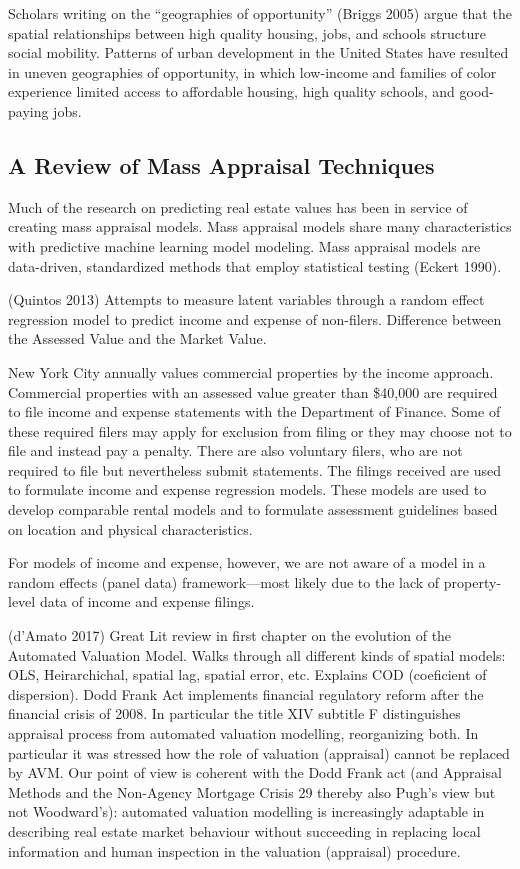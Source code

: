 \documentclass[]{article}
\begin{document}
Scholars writing on the ``geographies of opportunity'' (Briggs 2005)
argue that the spatial relationships between high quality housing, jobs,
and schools structure social mobility. Patterns of urban development in
the United States have resulted in uneven geographies of opportunity, in
which low-income and families of color experience limited access to
affordable housing, high quality schools, and good-paying jobs.

\subsection{A Review of Mass Appraisal
Techniques}\label{a-review-of-mass-appraisal-techniques}

Much of the research on predicting real estate values has been in
service of creating mass appraisal models. Mass appraisal models share
many characteristics with predictive machine learning model modeling.
Mass appraisal models are data-driven, standardized methods that employ
statistical testing (Eckert 1990).

(Quintos 2013) Attempts to measure latent variables through a random
effect regression model to predict income and expense of non-filers.
Difference between the Assessed Value and the Market Value.

New York City annually values commercial properties by the income
approach. Commercial properties with an assessed value greater than
\$40,000 are required to file income and expense statements with the
Department of Finance. Some of these required filers may apply for
exclusion from filing or they may choose not to file and instead pay a
penalty. There are also voluntary filers, who are not required to file
but nevertheless submit statements. The filings received are used to
formulate income and expense regression models. These models are used to
develop comparable rental models and to formulate assessment guidelines
based on location and physical characteristics.

For models of income and expense, however, we are not aware of a model
in a random effects (panel data) framework---most likely due to the lack
of property-level data of income and expense filings.

(d'Amato 2017) Great Lit review in first chapter on the evolution of the
Automated Valuation Model. Walks through all different kinds of spatial
models: OLS, Heirarchichal, spatial lag, spatial error, etc. Explains
COD (coeficient of dispersion). Dodd Frank Act implements financial
regulatory reform after the financial crisis of 2008. In particular the
title XIV subtitle F distinguishes appraisal process from automated
valuation modelling, reorganizing both. In particular it was stressed
how the role of valuation (appraisal) cannot be replaced by AVM. Our
point of view is coherent with the Dodd Frank act (and Appraisal Methods
and the Non-Agency Mortgage Crisis 29 thereby also Pugh's view but not
Woodward's): automated valuation modelling is increasingly adaptable in
describing real estate market behaviour without succeeding in replacing
local information and human inspection in the valuation (appraisal)
procedure.
\end{document}
